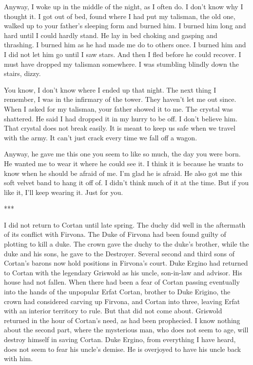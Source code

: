 \documentclass{article}
\begin{document}
Anyway, I woke up in the middle of the night, as I often do. I don't know why I thought it. I got out of bed, found where I had put my talisman, the old one, walked up to your father's sleeping form and burned him. I burned him long and hard until I could hardly stand. He lay in bed choking and gasping and thrashing. I burned him as he had made me do to others once. I burned him and I did not let him go until I saw stars. And then I fled before he could recover. I must have dropped my talisman somewhere. I was stumbling blindly down the stairs, dizzy.

You know, I don't know where I ended up that night. The next thing I remember, I was in the infirmary of the tower. They haven't let me out since. When I asked for my talisman, your father showed it to me. The crystal was shattered. He said I had dropped it in my hurry to be off. I don't believe him. That crystal does not break easily. It is meant to keep us safe when we travel with the army. It can't just crack every time we fall off a wagon. 

Anyway, he gave me this one you seem to like so much, the day you were born. He wanted me to wear it where he could see it. I think it is because he wants to know when he should be afraid of me. I'm glad he is afraid. He also got me this soft velvet band to hang it off of. I didn't think much of it at the time. But if you like it, I'll keep wearing it. Just for you.

***

\vspace{.5cm}

I did not return to Cortan until late spring. The duchy did well in the aftermath of its conflict with Firvona. The Duke of Firvona had been found guilty of plotting to kill a duke. The crown gave the duchy to the duke's brother, while the duke and his sons, he gave to the Destroyer. Several second and third sons of Cortan's barons now hold positions in Firvona's court. Duke Ergino had returned to Cortan with the legendary Griswold as his uncle, son-in-law and advisor. His house had not fallen. When there had been a fear of Cortan passing eventually into the hands of the unpopular Erfat Cortan, brother to Duke Erigino, the crown had considered carving up Firvona, and Cortan into three, leaving Erfat with an interior territory to rule. But that did not come about. Griswold returned in the hour of Cortan's need, as had been prophecied. I know nothing about the second part, where the mysterious man, who does not seem to age, will destroy himself in saving Cortan. Duke Ergino, from everything I have heard, does not seem to fear his uncle's demise. He is overjoyed to have his uncle back with him. 
\end{document}
